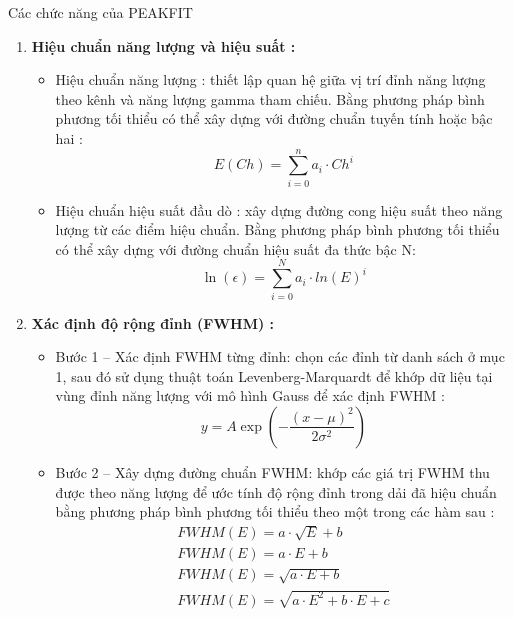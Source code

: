 \documentclass[final]{beamer}
\newlength{\leftcolwidth}  %
\begin{document}
\begin{frame}[t]
\begin{columns}[t]
\begin{column}{\leftcolwidth}
\begin{block}{Các chức năng của PEAKFIT}
\begin{enumerate}
					\item \textbf{ Hiệu chuẩn năng lượng và hiệu suất :}
						\begin{itemize}
							\item Hiệu chuẩn năng lượng :  thiết lập quan hệ giữa vị trí đỉnh năng lượng theo kênh và năng lượng gamma tham chiếu. Bằng phương pháp bình phương tối thiểu có thể xây dựng với đường chuẩn tuyến tính hoặc bậc hai : 
							\begin{equation}
								E(Ch) = \sum_{i = 0}^n a_i \cdot Ch^i
							\end{equation}
							\item  Hiệu chuẩn hiệu suất đầu dò : xây dựng đường cong hiệu suất theo năng lượng từ các điểm hiệu chuẩn. 	Bằng phương pháp bình phương tối thiểu có thể xây dựng với đường chuẩn hiệu suất đa thức bậc N: 
							\begin{equation}
								\ln(\epsilon) = \sum_{i = 0}^N a_i \cdot ln(E)^i
							\end{equation}
						\end{itemize}
					\item \textbf{Xác định độ rộng đỉnh (FWHM) : }\\
					\begin{itemize}
						\item Bước 1 – Xác định FWHM từng đỉnh: chọn các đỉnh từ danh sách ở mục 1, sau đó sử dụng thuật toán Levenberg-Marquardt để khớp dữ liệu  tại vùng đỉnh năng lượng với mô hình Gauss để xác định FWHM : 
						\begin{equation}
							y = A \exp\left(-\frac{(x-\mu)^2}{2\sigma^2}\right)
						\end{equation}
						\item Bước 2 – Xây dựng đường chuẩn FWHM: khớp các giá trị FWHM thu được theo năng lượng để ước tính độ rộng đỉnh trong dải đã hiệu chuẩn bằng phương pháp bình phương tối thiểu theo một trong các hàm sau : 
						\begin{gather}
							FWHM(E) = a \cdot \sqrt{E} + b\\
							FWHM(E) =  a\cdot E + b\\
							FWHM(E) = \sqrt{ a \cdot E + b } \\
							FWHM(E) = \sqrt{a\cdot E^2 + b \cdot E + c }
						\end{gather}
					
					\end{itemize}

				\end{enumerate} 
				


\end{block}
\end{column}
\end{columns}
\end{frame}
\end{document}
